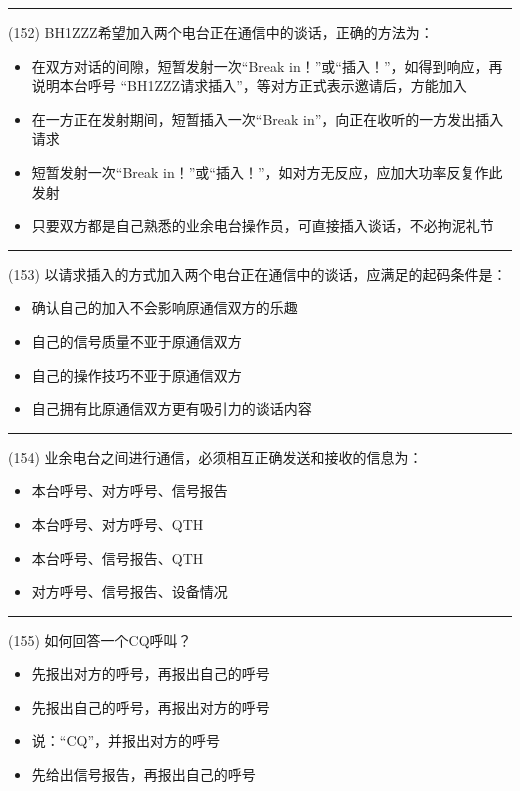 \documentclass[twocolumn]{ctexart}  %
\begin{document}
\noindent\rule{0.5\textwidth}{1pt}
\heiti (152) BH1ZZZ希望加入两个电台正在通信中的谈话，正确的方法为： \songti {\color{gray} [LK0244] }
\begin{itemize}
	\item  在双方对话的间隙，短暂发射一次“Break in！”或“插入！”，如得到响应，再说明本台呼号 “BH1ZZZ请求插入”，等对方正式表示邀请后，方能加入
	\item  在一方正在发射期间，短暂插入一次“Break in”，向正在收听的一方发出插入请求
	\item  短暂发射一次“Break in！”或“插入！”，如对方无反应，应加大功率反复作此发射
	\item  只要双方都是自己熟悉的业余电台操作员，可直接插入谈话，不必拘泥礼节
\end{itemize}


\noindent\rule{0.5\textwidth}{1pt}
\heiti (153) 以请求插入的方式加入两个电台正在通信中的谈话，应满足的起码条件是： \songti {\color{gray} [LK0245] }
\begin{itemize}
	\item  确认自己的加入不会影响原通信双方的乐趣
	\item  自己的信号质量不亚于原通信双方
	\item  自己的操作技巧不亚于原通信双方
	\item  自己拥有比原通信双方更有吸引力的谈话内容
\end{itemize}


\noindent\rule{0.5\textwidth}{1pt}
\heiti (154) 业余电台之间进行通信，必须相互正确发送和接收的信息为： \songti {\color{gray} [LK1046] }
\begin{itemize}
	\item  本台呼号、对方呼号、信号报告
	\item  本台呼号、对方呼号、QTH
	\item  本台呼号、信号报告、QTH
	\item  对方呼号、信号报告、设备情况
\end{itemize}


\noindent\rule{0.5\textwidth}{1pt}
\heiti (155) 如何回答一个CQ呼叫？ \songti {\color{gray} [LK1097] }
\begin{itemize}
	\item  先报出对方的呼号，再报出自己的呼号
	\item  先报出自己的呼号，再报出对方的呼号
	\item  说：“CQ”，并报出对方的呼号
	\item  先给出信号报告，再报出自己的呼号
\end{itemize}
\end{document}
